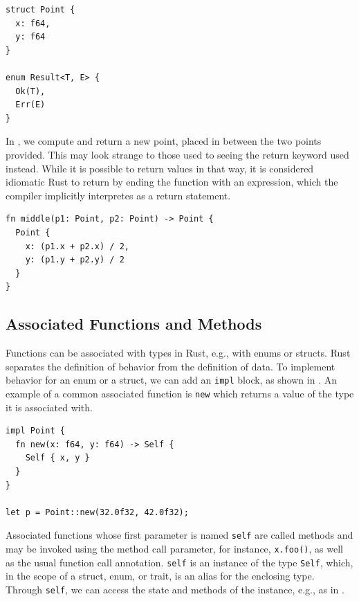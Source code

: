 \documentclass[paper=a4,%
  twoside,%
  BCOR4mm,%
  abstract=true,%
  toc=bibliography,%
  chapterprefix=true,%
  toc=bibliographynumbered,%
  open=right,%
  english,%
  pagesize=pdftex]{scrreprt}
\begin{document}
\begin{lstlisting}[style=boxed, caption={The type definition for a point in two-dimensional space and an enum definition}, label=lst:example-struct-enum]
struct Point {
  x: f64,
  y: f64
}

enum Result<T, E> {
  Ok(T),
  Err(E)
}
\end{lstlisting}

In , we compute and return a new point, placed in between the two points provided. This may look strange to those used to seeing the return keyword used instead. While it is possible to return values in that way, it is considered idiomatic Rust to return by ending the function with an expression, which the compiler implicitly interpretes as a return statement.

\begin{lstlisting}[style=boxed, caption={A function to compute the point between two points in two-dimensional space}, label=lst:example-functions-struct-enum]
fn middle(p1: Point, p2: Point) -> Point {
  Point {
    x: (p1.x + p2.x) / 2,
    y: (p1.y + p2.y) / 2
  }
}
\end{lstlisting}

\subsection{Associated Functions and Methods}
Functions can be associated with types in Rust, e.g., with enums or structs. Rust separates the definition of behavior from the definition of data. To implement behavior for an enum or a struct, we can add an \texttt{impl} block, as shown in . An example of a common associated function is \texttt{new} which returns a value of the type it is associated with.

\begin{lstlisting}[style=boxed, caption={Associating behavior with the \texttt{Point} data type defined in \Cref{lst:example-struct-enum}}, label=lst:example-associated-function]
impl Point {
  fn new(x: f64, y: f64) -> Self {
    Self { x, y }
  }
}

let p = Point::new(32.0f32, 42.0f32);
\end{lstlisting}

Associated functions whose first parameter is named \texttt{self} are called methods and may be invoked using the method call parameter, for instance, \texttt{x.foo()}, as well as the usual function call annotation. \texttt{self} is an instance of the type \texttt{Self}, which, in the scope of a struct, enum, or trait, is an alias for the enclosing type. Through \texttt{self}, we can access the state and methods of the instance, e.g., as in .
\end{document}
